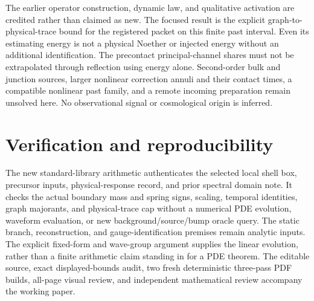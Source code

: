 \documentclass[11pt]{article}
\begin{document}
The earlier operator construction, dynamic law, and qualitative activation
are credited rather than claimed as new. The focused result is the
explicit graph-to-physical-trace bound for the registered packet on this
finite past interval. Even its estimating energy is not a physical
Noether or injected energy without an additional identification.
The precontact principal-channel shares must not be extrapolated through
reflection using energy alone.
Second-order bulk and junction sources, larger nonlinear correction
annuli and their contact times, a compatible nonlinear past family, and a
remote incoming preparation remain unsolved here. No observational signal
or cosmological origin is inferred.

\section{Verification and reproducibility}
The new standard-library arithmetic authenticates the selected local
shell box, precursor inputs, physical-response record, and prior spectral
domain note. It checks the actual boundary mass and spring signs,
scaling, temporal identities, graph majorants, and physical-trace cap
without a numerical PDE evolution, waveform evaluation, or new
background/source/bump oracle query.
The static branch, reconstruction, and gauge-identification premises
remain analytic inputs. The explicit fixed-form and wave-group argument
supplies the linear evolution, rather than a finite arithmetic claim
standing in for a PDE theorem.
The editable source, exact displayed-bounds audit, two fresh deterministic
three-pass PDF builds, all-page visual review, and independent
mathematical review accompany the working paper.
\end{document}
